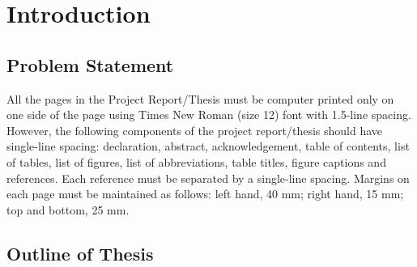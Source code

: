 \chapter{Introduction}  %



\section{Problem Statement} %

 

 

All the pages in the Project Report/Thesis must be computer printed only on one side of the page using
Times New Roman (size 12) font with 1.5-line spacing.
However, the following components of the project report/thesis should have single-line spacing: declaration, abstract, acknowledgement, table of contents, list of tables, list of figures, list of abbreviations, table titles, figure captions and references. 
Each reference must be separated by a single-line spacing. Margins on each page must be maintained as
follows: left hand, 40 mm; right hand, 15 mm; top and bottom, 25 mm.  

\citep{Streftaris2004} 
 
\section{Outline of Thesis}